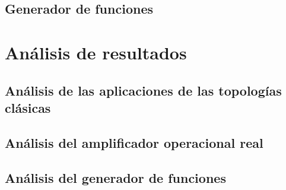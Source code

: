 \documentclass{article}
\begin{document}
\subsection{Generador de funciones}
\label{sec:resultados-generador-funciones}

\FloatBarrier

\section{Análisis de resultados}
\subsection{Análisis de las aplicaciones de las topologías clásicas}

\FloatBarrier
\subsection{Análisis del amplificador operacional real}

\FloatBarrier
\subsection{Análisis del generador de funciones}


\FloatBarrier


\FloatBarrier
% 
\printbibliography[heading=bibintoc, title={Bibliografía}]
\end{document}
